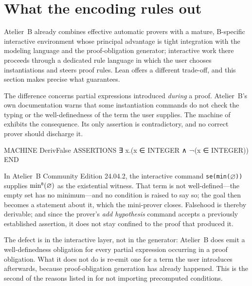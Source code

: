 \section{What the encoding rules out}
\label{sec:barrel-atelier-comparison}

Atelier~B already combines effective automatic provers with a mature, B-specific
interactive environment whose principal advantage is tight integration with the modeling
language and the proof-obligation generator; interactive work there proceeds through a
dedicated rule language in which the user chooses instantiations and steers proof rules.
Lean offers a different trade-off, and this section makes precise what
 guarantees.

The difference concerns partial expressions introduced \emph{during} a proof.
Atelier~B's own documentation warns that some instantiation commands do not check the
typing or the well-definedness of the term the user supplies.
The machine of  exhibits the consequence.
Its only assertion is contradictory, and no correct prover should discharge it.

\begin{blisting}[title={A machine whose only assertion is contradictory.},
    label={lst:barrel-derive-false}]
MACHINE DerivFalse
ASSERTIONS
  ∃ x.(x ∈ INTEGER ∧ ¬(x ∈ INTEGER))
END
\end{blisting}

In Atelier~B Community Edition 24.04.2, the interactive command \texttt{se(min(\(\varnothing\)))}
supplies \(\mathop{{\min}^{\scriptscriptstyle{\mathsf{B}}}}(\varnothing)\) as the existential witness.
That term is not well-defined---the empty set has no minimum---and no condition is raised
to say so; the goal then becomes a statement about it, which the mini-prover closes.
Falsehood is thereby derivable; and since the prover's \emph{add hypothesis} command
accepts a previously established assertion, it does not stay confined to the proof that
produced it.

\begin{remark}
  The defect is in the interactive layer, not in the generator: Atelier~B does emit a
  well-definedness obligation for every partial expression occurring in a proof obligation.
  What it does not do is re-emit one for a term the user introduces afterwards, because
  proof-obligation generation has already happened.
  This is the second of the reasons listed in  for not importing
  precomputed conditions.
\end{remark}

